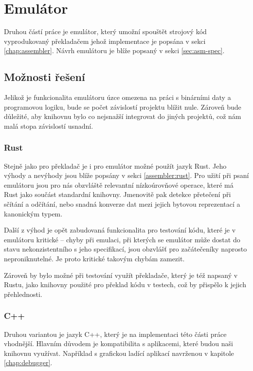 \chapter{Emulátor}

Druhou částí práce je emulátor, který umožní spouštět strojový kód vyprodukovaný překladačem jehož implementace je popsána v sekci \ref{chap:assembler}. Návrh emulátoru je blíže popsaný v sekci \ref{sec:asm-spec}.

\section{Možnosti řešení}

Jelikož je funkcionalita emulátoru úzce omezena na práci s binárními daty a programovou logiku, bude se počet závislostí projektu blížit nule. Zároveň bude důležité, aby knihovnu bylo co nejsnažší integrovat do jiných projektů, což nám malá stopa závislostí usnadní.

\subsection{Rust}

Stejně jako pro překladač je i pro emulátor možné použít jazyk Rust. Jeho výhody a nevýhody jsou blíže popsány v sekci \ref{assembler:rust}. Pro užití při psaní emulátoru jsou pro nás obzvláště relevantní nízkoúrovňové operace, které má Rust jako součást standardní knihovny. Jmenovitě pak detekce přetečení při sčítání a odčítání\todocite, nebo snadná konverze dat mezi jejich bytovou reprezentací a kanonickým typem\todocite.

Další z výhod je opět zabudovaná funkcionalita pro testování kódu, které je v emulátoru kritické -- chyby při emulaci, při kterých se emulátor může dostat do stavu nekonzistentního s jeho specifikací, jsou obzvlášť pro začátečeníky naprosto neproniknutelné. Je proto kritické takovým chybám zamezit.

Zároveň by bylo možné při testování využít překladače, který je též napsaný v Rustu, jako knihovny použité pro překlad kódu v testech, což by přispělo k jejich přehlednosti.

\subsection{C++}

Druhou variantou je jazyk C++, který je na implementaci této části práce vhodnější. Hlavním důvodem je kompatibilita s aplikacemi, které budou naši knihovnu využívat. Například s grafickou ladící aplikací navrženou v kapitole \ref{chap:debugger}.

